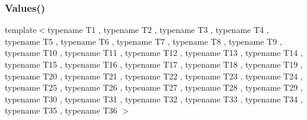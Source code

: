 \subsubsection{\texorpdfstring{Values()}{Values()}\hspace{0.1cm}{\footnotesize\ttfamily [37/51]}}
{\footnotesize\ttfamily template$<$typename T1 , typename T2 , typename T3 , typename T4 , typename T5 , typename T6 , typename T7 , typename T8 , typename T9 , typename T10 , typename T11 , typename T12 , typename T13 , typename T14 , typename T15 , typename T16 , typename T17 , typename T18 , typename T19 , typename T20 , typename T21 , typename T22 , typename T23 , typename T24 , typename T25 , typename T26 , typename T27 , typename T28 , typename T29 , typename T30 , typename T31 , typename T32 , typename T33 , typename T34 , typename T35 , typename T36 $>$ \\
}
